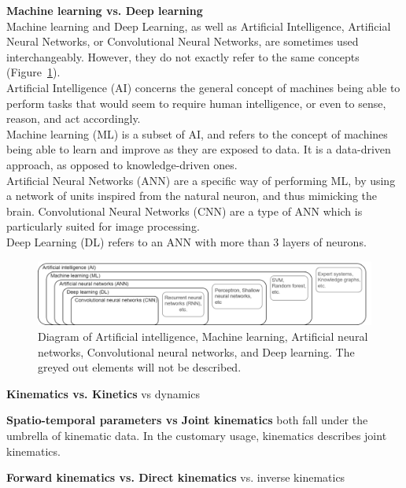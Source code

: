 \noindent\textbf{Machine learning vs. Deep learning}\\
Machine learning and Deep Learning, as well as Artificial Intelligence, Artificial Neural Networks, or Convolutional Neural Networks, are sometimes used interchangeably. However, they do not exactly refer to the same concepts (Figure~\ref{fig_ai}).\\
Artificial Intelligence (AI) concerns the general concept of machines being able to perform tasks that would seem to require human intelligence, or even to sense, reason, and act accordingly. \\
Machine learning (ML) is a subset of AI, and refers to the concept of machines being able to learn and improve as they are exposed to data. It is a data-driven approach, as opposed to knowledge-driven ones.\\
Artificial Neural Networks (ANN) are a specific way of performing ML, by using a network of units inspired from the natural neuron, and thus mimicking the brain. Convolutional Neural Networks (CNN) are a type of ANN which is particularly suited for image processing.\\
Deep Learning (DL) refers to an ANN with more than 3 layers of neurons.

\begin{figure}[hbtp]
	\centering
            \def\svgwidth{1\columnwidth}
            \fontsize{10pt}{10pt}\selectfont
            \includegraphics[width=\linewidth]{"../Annexes/Figures/AI_CNN_etc.png"}
            \caption{Diagram of Artificial intelligence, Machine learning, Artificial neural networks, Convolutional neural networks, and Deep learning. The greyed out elements will not be described.}
            \label{fig_ai}
\end{figure}

\vspace*{0.5cm}

\noindent\textbf{Kinematics vs. Kinetics }
vs dynamics

\vspace*{0.5cm}

\noindent\textbf{Spatio-temporal parameters vs Joint kinematics}
both fall under the umbrella of kinematic data. In the customary usage, kinematics describes joint kinematics.

\vspace*{0.5cm}

\noindent\textbf{Forward kinematics vs. Direct kinematics}
vs. inverse kinematics





